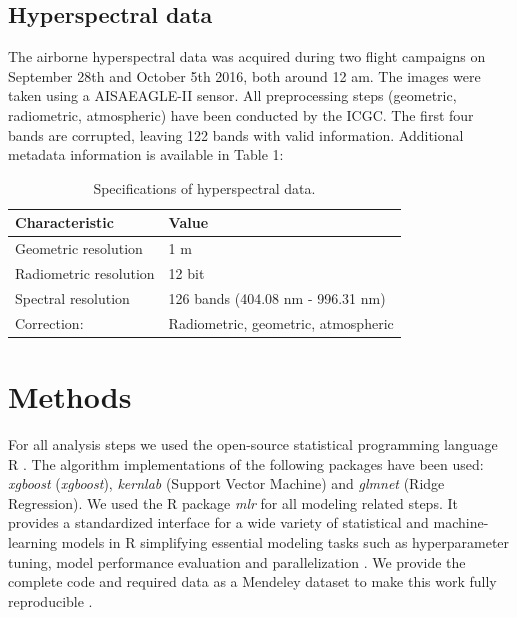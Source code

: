 \documentclass[review]{elsarticle}
\begin{document}
\subsection{Hyperspectral data}

The airborne hyperspectral data was acquired during two flight campaigns on September 28th and October 5th 2016, both around 12 am.
The images were taken using a AISAEAGLE-II sensor.
All preprocessing steps (geometric, radiometric, atmospheric) have been conducted by the \ac{ICGC}.
The first four bands are corrupted, leaving 122 bands with valid information.
Additional metadata information is available in Table 1:

\begin{table}[t!]
\centering
\caption[t]{Specifications of hyperspectral data.}
\begingroup\footnotesize
\begin{tabular}{ll}
	\\
	Characteristic         & Value                               \\
	\hline
	Geometric resolution   & 1 m                                 \\
	Radiometric resolution & 12 bit                              \\
	Spectral resolution    & 126 bands (404.08 nm - 996.31 nm)   \\
	Correction:            & Radiometric, geometric, atmospheric
\end{tabular}
\endgroup
\label{tab:hyperparameter_limits}
\end{table}

\section{Methods}

\noindent For all analysis steps we used the open-source statistical programming language R \citep{R_core}.
The algorithm implementations of the following packages have been used: \textit{xgboost} \citep{chenXGBoostScalableTree2016} (\textit{xgboost}), \textit{kernlab} \citep{kernlab} (Support Vector Machine) and \textit{glmnet} \citep{glmnet} (Ridge Regression).
We used the R package \textit{mlr} for all modeling related steps.
It provides a standardized interface for a wide variety of statistical and machine-learning models in R simplifying essential modeling tasks such as hyperparameter tuning, model performance evaluation and parallelization \citep{bischlMlrMachineLearning2016}.
We provide the complete code and required data as a Mendeley dataset to make this work fully reproducible \citep{}.
\end{document}
